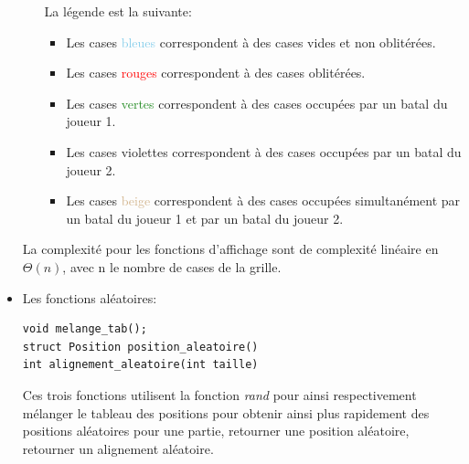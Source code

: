 \begin{itemize}
\begin{itemize}
La légende est la suivante:

\begin{itemize}
\item Les cases \textcolor{SkyBlue}{bleues} correspondent à des cases vides et non oblitérées.
\item Les cases \textcolor{red}{rouges} correspondent à des cases oblitérées.
\item Les cases \textcolor{ForestGreen}{vertes} correspondent à des cases occupées par un batal du joueur 1.
\item Les cases \textcolor{Mulberry}{violettes} correspondent à des cases occupées par un batal du joueur 2.
\item Les cases \textcolor{Tan}{beige} correspondent à des cases occupées simultanément par un batal du joueur 1 et par un batal du joueur 2.
\end{itemize}

\end{itemize}
La complexité pour les fonctions d'affichage sont de complexité linéaire en $\Theta(n)$, avec n le nombre de cases de la grille.


\item Les fonctions aléatoires:
\begin{lstlisting} 
void melange_tab();
struct Position position_aleatoire()
int alignement_aleatoire(int taille)
\end{lstlisting}
Ces trois fonctions utilisent la fonction \textit{rand} pour ainsi respectivement mélanger le tableau des positions pour obtenir ainsi plus rapidement des positions aléatoires pour une partie, retourner une position aléatoire, retourner un alignement aléatoire.

\end{itemize}

